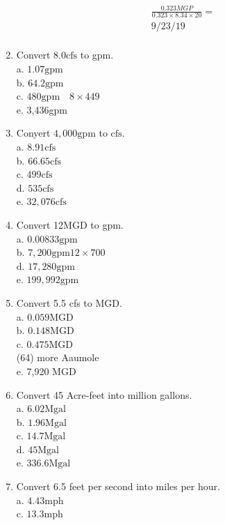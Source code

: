 \begin{enumerate}
$$
\begin{gathered}
\frac{0.323 M G P}{0.323 \times 8.34 \times 20}= \\
9 / 23 / 19\\
\end{gathered}
$$
\item Convert $8.0 \mathrm{cfs}$ to gpm.\\
a. $1.07 \mathrm{gpm}$\\
b. $64.2 \mathrm{gpm}$\\
c. $480 \mathrm{gpm} \quad 8 \times 449$\\
e. 3,436gpm\\
\item Conyert $4,000 \mathrm{gpm}$ to $\mathrm{cfs}$.\\
a. $8.91 \mathrm{cfs}$\\
b. $66.65 \mathrm{cfs}$\\
c. $499 \mathrm{cfs}$\\
d. $535 \mathrm{cfs}$\\
e. $32,076 \mathrm{cfs}$\\
\item Convert 12MGD to gpm.\\
a. $0.00833 \mathrm{gpm}$\\
b. $7,200 \mathrm{gpm} 12 \times 700$\\
d. $17,280 \mathrm{gpm}$\\
e. $199,992 \mathrm{gpm}$\\
\item Convert 5.5 cfs to MGD.\\
a. $0.059 \mathrm{MGD}$\\
b. $0.148 \mathrm{MGD}$\\
c. $0.475 \mathrm{MGD}$\\
(64) more Aaumole\\
e. 7,920 MGD\\
\item Convert 45 Acre-feet into million gallons.\\
a. $6.02 \mathrm{Mgal}$\\
b. $1.96 \mathrm{Mgal}$\\
c. $14.7 \mathrm{Mgal}$\\
d. $45 \mathrm{Mgal}$\\
e. $336.6 \mathrm{Mgal}$\\
\item Convert 6.5 feet per second into miles per hour.\\
a. $4.43 \mathrm{mph}$\\
c. $13.3 \mathrm{mph}$\\

\end{enumerate}
